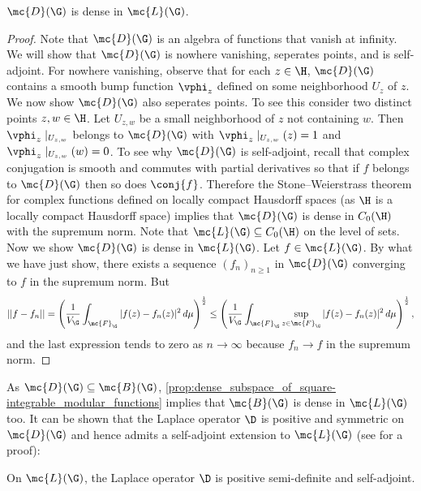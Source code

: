     \begin{proposition}\label{prop:dense_subspace_of_square-integrable_modular_functions}
      $\mc{D}(\G)$ is dense in $\mc{L}(\G)$.
    \end{proposition}
    \begin{proof}
      Note that $\mc{D}(\G)$ is an algebra of functions that vanish at infinity. We will show that $\mc{D}(\G)$ is nowhere vanishing, seperates points, and is self-adjoint. For nowhere vanishing, observe that for each $z \in \H$, $\mc{D}(\G)$ contains a smooth bump function $\vphi_{z}$ defined on some neighborhood $U_{z}$ of $z$. We now show $\mc{D}(\G)$ also seperates points. To see this consider two distinct points $z,w \in \H$. Let $U_{z,w}$ be a small neighborhood of $z$ not containing $w$. Then $\vphi_{z}\mid_{U_{z,w}}$ belongs to $\mc{D}(\G)$ with $\vphi_{z}\mid_{U_{z,w}}(z) = 1$ and $\vphi_{z}\mid_{U_{z,w}}(w) = 0$. To see why $\mc{D}(\G)$ is self-adjoint, recall that complex conjugation is smooth and commutes with partial derivatives so that if $f$ belongs to $\mc{D}(\G)$ then so does $\conj{f}$. Therefore the Stone–Weierstrass theorem for complex functions defined on locally compact Hausdorff spaces (as $\H$ is a locally compact Hausdorff space) implies that $\mc{D}(\G)$ is dense in $C_{0}(\H)$ with the supremum norm. Note that $\mc{L}(\G) \subseteq C_{0}(\H)$ on the level of sets. Now we show $\mc{D}(\G)$ is dense in $\mc{L}(\G)$. Let $f \in \mc{L}(\G)$. By what we have just show, there exists a sequence $(f_{n})_{n \ge 1}$ in $\mc{D}(\G)$ converging to $f$ in the supremum norm. But 
      \[
        ||f-f_{n}|| = \left(\frac{1}{V_{\G}}\int_{\mc{F}_{\G}}|f(z)-f_{n}(z)|^{2}\,d\mu\right)^{\frac{1}{2}} \le \left(\frac{1}{V_{\G}}\int_{\mc{F}_{\G}}\sup_{z \in \mc{F}_{\G}}|f(z)-f_{n}(z)|^{2}\,d\mu\right)^{\frac{1}{2}},
      \]
      and the last expression tends to zero as $n \to \infty$ because $f_{n} \to f$ in the supremum norm.
    \end{proof}

    As $\mc{D}(\G) \subseteq \mc{B}(\G)$, \cref{prop:dense_subspace_of_square-integrable_modular_functions} implies that $\mc{B}(\G)$ is dense in $\mc{L}(\G)$ too. It can be shown that the Laplace operator $\D$ is positive and symmetric on $\mc{D}(\G)$ and hence admits a self-adjoint extension to $\mc{L}(\G)$ (see \cite{iwaniec2002spectral} for a proof):

    \begin{theorem}\label{thm:Laplace_semi-definite_self-adjoint}
      On $\mc{L}(\G)$, the Laplace operator $\D$ is positive semi-definite and self-adjoint.
    \end{theorem}

